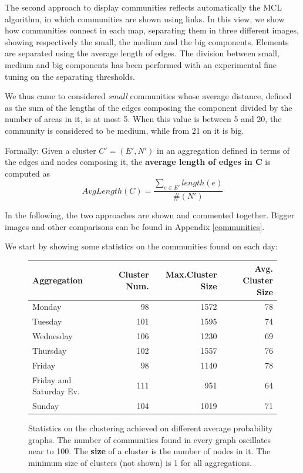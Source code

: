 \documentclass[12pt,a4paper]{article}
\begin{document}
The second approach to display communities reflects automatically the MCL algorithm, in which communities are shown using links. In this view, we show how communities connect in each map, separating them in three different images, showing
respectively the small, the medium and the big components. Elements are separated using the average length of edges. The division between small, medium and big components has been performed with an experimental fine tuning on the separating thresholds.


We thus came to considered \emph{small} communities whose average distance, defined as the sum of the lengths of the edges composing the component divided by the number of areas in it, is at most 5. When this value is between 5 and 20, the community is considered to be medium, while from 21 on it is big.

Formally: Given a cluster $C' = (E', N')$ in an aggregation defined in terms of the
edges and nodes composing it, the \textbf{average length of edges in C} is computed as
$$AvgLength(C) = \frac{\sum_{e \in E'} length(e)}{\#(N')} $$

In the following, the two approaches are shown and commented together. Bigger images and other comparisons can be found in Appendix \ref{communities}. 

We start by showing some statistics on the communities found on each day:

\begin{figure}[H]
\centering
\begin{tabular}{| l | r | r | r |}
\hline
\textbf{Aggregation} & \textbf{Cluster Num.} & \textbf{Max.Cluster Size} & \textbf{Avg. Cluster Size} \\ \hline
Monday & 98 & 1572 & 78 \\ \hline
Tuesday & 101 & 1595 & 74 \\ \hline
Wednesday & 106 & 1230  & 69 \\ \hline
Thursday & 102 & 1557  & 76 \\ \hline
Friday &  98 & 1140 & 78 \\ \hline
Friday and Saturday Ev. & 111 & 951 & 64 \\ \hline
Sunday & 104 & 1019 & 71 \\ \hline
\end{tabular}
\caption{Statistics on the clustering achieved on different average probability graphs. 
The number of communities found
in every graph oscillates near to 100. 
The \textbf{size} of a cluster is the number of nodes in it.
The minimum size of clusters (not shown) is 1 for all aggregations.}
\label{fig:foundClusters}
\end{figure}
\end{document}
